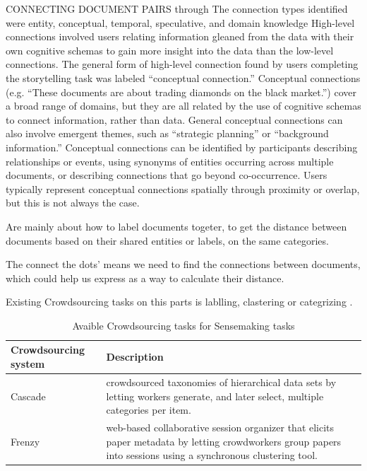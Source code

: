 \documentclass[journal]{vgtc}                %
\begin{document}
CONNECTING DOCUMENT PAIRS through
The connection types identified were entity, conceptual, temporal, speculative, and domain knowledge
High-level connections involved users relating information gleaned from the data with their own cognitive schemas to gain more insight into the data than the low-level connections. The general form of high-level connection found by users completing the storytelling task was labeled “conceptual connection.” Conceptual connections (e.g. “These documents are about trading diamonds on the black market.”) cover a broad range of domains, but they are all related by the use of cognitive schemas to connect information, rather than data. General conceptual connections can also involve emergent themes, such as “strategic planning” or “background information.” Conceptual connections can be identified by participants describing relationships or events, using synonyms of entities occurring across multiple documents, or describing connections that go beyond co-occurrence. Users typically represent conceptual connections spatially through proximity or overlap, but this is not always the case.

Are mainly about how to label documents togeter, to get the distance between documents based on their shared entities or labels, on the same categories.


The connect the dots' means we need to find the connections between documents, which could help us express as a way to calculate their distance.


Existing Crowdsourcing tasks on this parts is lablling, clastering or categrizing .
\begin{table}[tb]
  \caption{Avaible Crowdsourcing tasks for Sensemaking tasks}
  \label{tab:tasks}
  \scriptsize%
	\centering%
\begin{tabular}{| m{2cm} | m{6cm} |}
  \hline
   Crowdsourcing system & Description \\
  \hline
  Cascade & crowdsourced taxonomies of hierarchical data sets by letting workers generate, and later select, multiple categories per item. \\
  Frenzy &  web-based collaborative session organizer that elicits paper metadata by letting crowdworkers group papers into sessions using a synchronous clustering tool.\\
  \bottomrule
\end{tabular}
\end{table}
\end{document}
